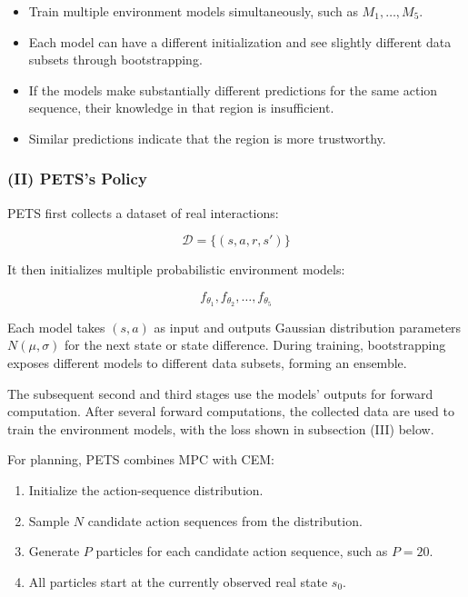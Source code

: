 \begin{itemize}
\tightlist
\item
  Train multiple environment models simultaneously, such as \(M_1,\ldots,M_5\).
\item
  Each model can have a different initialization and see slightly different data subsets through bootstrapping.
\item
  If the models make substantially different predictions for the same action sequence, their knowledge in that region is insufficient.
\item
  Similar predictions indicate that the region is more trustworthy.
\end{itemize}

\hypertarget{ii-petss-policy}{%
\subsubsection{(II) PETS's Policy}\label{ii-petss-policy}}

PETS first collects a dataset of real interactions:

\[
\mathcal D=\{(s,a,r,s')\}
\]

It then initializes multiple probabilistic environment models:

\[
f_{\theta_1},f_{\theta_2},\ldots,f_{\theta_5}
\]

Each model takes \((s,a)\) as input and outputs Gaussian distribution parameters \(N(\mu,\sigma)\) for the next state or state difference. During training, bootstrapping exposes different models to different data subsets, forming an ensemble.

The subsequent second and third stages use the models' outputs for forward computation. After several forward computations, the collected data are used to train the environment models, with the loss shown in subsection (III) below.

For planning, PETS combines MPC with CEM:

\begin{enumerate}
\def\labelenumi{\arabic{enumi}.}
\tightlist
\item
  Initialize the action-sequence distribution.
\item
  Sample \(N\) candidate action sequences from the distribution.
\item
  Generate \(P\) particles for each candidate action sequence, such as \(P=20\).
\item
  All particles start at the currently observed real state \(s_0\).
\end{enumerate}

